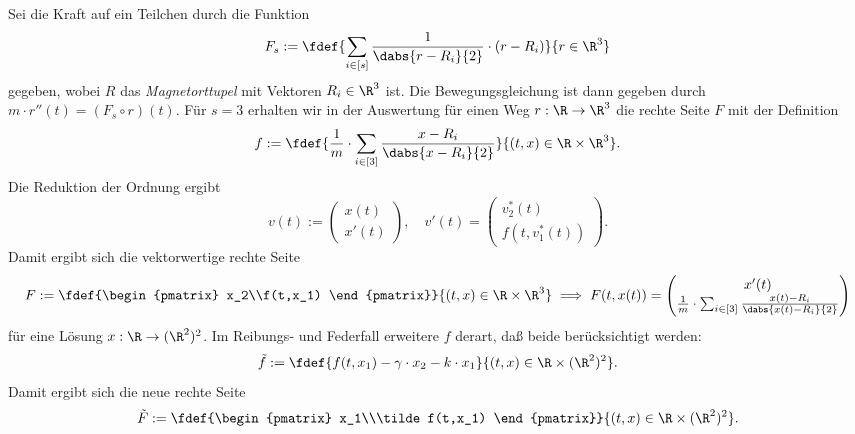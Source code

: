 \documentclass[
    oneside,
    ngerman,
    footinclude=false,
    captions=tableheading,
    DIV=12
]{scrartcl}
\begin{document}
\aufgabe{}
\subaufgabe{}
    Sei die Kraft auf ein Teilchen durch die Funktion
    \[F_s:=\fdef{\sum_{i\in[s]}\frac{1}{\dabs{r - R_i}{2}}\cdot (r-R_i)}{r\in\R^3}\]
    gegeben, wobei $R$ das \emph{Magnetorttupel} mit Vektoren $R_i\in\R^3$ ist. Die Bewegungsgleichung ist dann gegeben durch $m\cdot r''(t) = (F_s\circ r)(t)$. Für $s = 3$ erhalten wir in der Auswertung für einen Weg $r:\R\to\R^3$ die rechte Seite $F$ mit der Definition
    \[f:=\fdef{\frac{1}{m}\cdot\sum_{i\in[3]}\frac{x-R_i}{\dabs{x-R_i}{2}}}{(t,x)\in\R\times\R^3}.\]
    Die Reduktion der Ordnung ergibt
    \[v(t):=\begin{pmatrix}
        x(t)\\x'(t)
    \end{pmatrix},\quad v'(t)=\begin{pmatrix}
        v_2^*(t)\\f(t,v_1^*(t))
    \end{pmatrix}.\]
    Damit ergibt sich die vektorwertige rechte Seite
    \[F:=\fdef{\begin{pmatrix}
        x_2\\f(t,x_1)
    \end{pmatrix}}{(t,x)\in\R\times\R^3}\implies F(t,x(t)) = \begin{pmatrix}
        x'(t)\\\frac{1}{m}\cdot\sum_{i\in[3]}\frac{x(t)-R_i}{\dabs{x(t)-R_i}{2}}
    \end{pmatrix}\]
    für eine Lösung $x:\R\to(\R^2)^2$. Im Reibungs- und Federfall erweitere $f$ derart, daß beide berücksichtigt werden:
    \[\tilde f:=\fdef{f(t,x_1) - \gamma\cdot x_2 - k\cdot x_1}{(t,x)\in\R\times(\R^2)^2}.\]
    Damit ergibt sich die neue rechte Seite
    \[\tilde F:=\fdef{\begin{pmatrix}
        x_1\\\tilde f(t,x_1)
    \end{pmatrix}}{(t,x)\in\R\times(\R^2)^2}.\]
\end{document}
